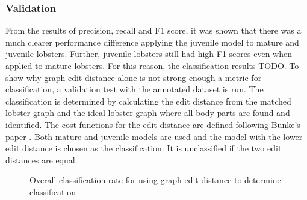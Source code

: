 \subsubsection{Validation}

From the results of precision, recall and F1 score, it was shown that there was a much clearer performance difference applying the juvenile model to mature and juvenile lobsters. Further, juvenile lobsters still had high F1 scores even when applied to mature lobsters. For this reason, the classification results TODO.
\n
To show why graph edit distance alone is not strong enough a metric for classification, a validation test with the annotated dataset is run. The classification is determined by calculating the edit distance from the matched lobster graph and the ideal lobster graph where all body parts are found and identified. The cost functions for the edit distance are defined following Bunke's paper \cite{graph-edit}. Both mature and juvenile models are used and the model with the lower edit distance is chosen as the classification. It is unclassified if the two edit distances are equal. 
\begin{figure}[H]
\centering
{}
\caption{Overall classification rate for using graph edit distance to determine classification}
\end{figure}
\noindent

